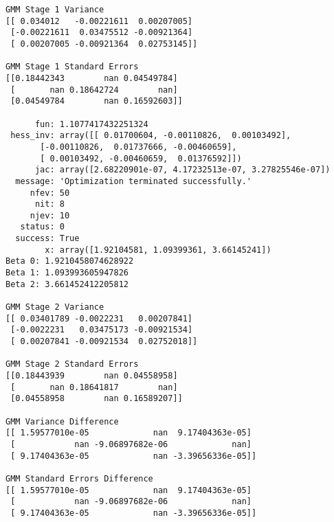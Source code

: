 \documentclass{article}
\begin{document}
\begin{lstlisting}
GMM Stage 1 Variance
[[ 0.034012   -0.00221611  0.00207005]
 [-0.00221611  0.03475512 -0.00921364]
 [ 0.00207005 -0.00921364  0.02753145]]

GMM Stage 1 Standard Errors
[[0.18442343        nan 0.04549784]
 [       nan 0.18642724        nan]
 [0.04549784        nan 0.16592603]]

      fun: 1.1077417432251324
 hess_inv: array([[ 0.01700604, -0.00110826,  0.00103492],
       [-0.00110826,  0.01737666, -0.00460659],
       [ 0.00103492, -0.00460659,  0.01376592]])
      jac: array([2.68220901e-07, 4.17232513e-07, 3.27825546e-07])
  message: 'Optimization terminated successfully.'
     nfev: 50
      nit: 8
     njev: 10
   status: 0
  success: True
        x: array([1.92104581, 1.09399361, 3.66145241])
Beta 0: 1.9210458074628922
Beta 1: 1.093993605947826
Beta 2: 3.661452412205812

GMM Stage 2 Variance
[[ 0.03401789 -0.0022231   0.00207841]
 [-0.0022231   0.03475173 -0.00921534]
 [ 0.00207841 -0.00921534  0.02752018]]

GMM Stage 2 Standard Errors
[[0.18443939        nan 0.04558958]
 [       nan 0.18641817        nan]
 [0.04558958        nan 0.16589207]]

GMM Variance Difference
[[ 1.59577010e-05             nan  9.17404363e-05]
 [            nan -9.06897682e-06             nan]
 [ 9.17404363e-05             nan -3.39656336e-05]]

GMM Standard Errors Difference
[[ 1.59577010e-05             nan  9.17404363e-05]
 [            nan -9.06897682e-06             nan]
 [ 9.17404363e-05             nan -3.39656336e-05]]
\end{lstlisting}
\end{document}
